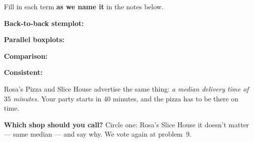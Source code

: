 \documentclass[12pt]{article}
\newcommand{\termrowheight}{2.3cm}
\newlength{\termrowinset}\setlength{\termrowinset}{7pt}
\newcommand{\vterm}[1]{%
  \par\noindent\begin{minipage}[t][\termrowheight][t]{\linewidth}%
    \vspace*{\termrowinset}%
    \textbf{\textcolor{cerulean}{#1:}}%
  \end{minipage}\par}
\begin{document}

\vspace{0.15in}

\boxguard[16]
\begin{vocabbox}
\small
Fill in each term \textbf{as we name it} in the notes below.
\vterm{Back-to-back stemplot}
\vterm{Parallel boxplots}
\vterm{Comparison}
\vterm{Consistent}
\end{vocabbox}

\boxguard[12]
\begin{hookbox}
\small
Rosa's Pizza and Slice House advertise the same thing: \emph{a median delivery time of
$35$ minutes.} Your party starts in $40$ minutes, and the pizza has to be there on time.

\vspace{3pt}
\textbf{Which shop should you call?} Circle one: \quad Rosa's \qquad Slice House \qquad
it doesn't matter --- same median \quad --- and say why. We vote again at problem~9.
\par{}
\end{hookbox}
\end{document}
